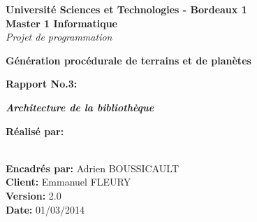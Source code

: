 \documentclass [a4paper,12pt,utf8]{report}
\begin{document}
\begin{titlepage}
\begin{center}
{\bf Université Sciences et Technologies - Bordeaux 1} \vspace{0.5cm}\\

{\bf {\large Master 1 Informatique }}\\
{ \emph{Projet de programmation}}\\\vspace{5cm}



{\huge{\bf Génération procédurale de terrains et de planètes}}\\\vspace{1cm}

{\large{\bf{Rapport No.3:}}}\vspace{1cm}

{\large\bf\it\rm Architecture de la bibliothèque
}\vspace{1cm}


\end{center}


\hspace{1cm}\textbf{Réalisé par:}

\hspace{1cm}{Simon CAULE}

\hspace{1cm}{Pierre HUCHANT}

\hspace{1cm}{Solène JOLLY}

\hspace{1cm}{Adrien LAMOUREUX}\\


\hspace{1cm}\textbf{Encadrés par:} Adrien BOUSSICAULT\\

\hspace{1cm}\textbf{Client:} Emmanuel FLEURY\\

\hspace{1cm}\textbf{Version:} 2.0\\

\hspace{1cm}\textbf{Date:} 01/03/2014\\

\end{titlepage}

\tableofcontents




\end{document}

